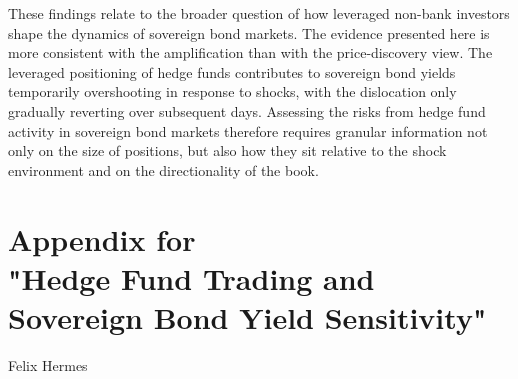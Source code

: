\documentclass[english, 11pt, oneside]{article}
\begin{document}
These findings relate to the broader question of how leveraged non-bank investors shape the dynamics of sovereign bond markets. The evidence presented here is more consistent with the amplification than with the price-discovery view. The leveraged positioning of hedge funds contributes to sovereign bond yields temporarily overshooting in response to shocks, with the dislocation only gradually reverting over subsequent days. Assessing the risks from hedge fund activity in sovereign bond markets therefore requires granular information not only on the size of positions, but also how they sit relative to the shock environment and on the directionality of the book.


\clearpage



\clearpage
\section*{Appendix for \\
"Hedge Fund Trading and Sovereign Bond Yield Sensitivity"}
\begin{center}
    
\large Felix Hermes
\end{center}

\vspace{2cm}
 \begin{abstract}
 \begin{hyphenrules}{nohyphenation} 

\noindent This paper presents evidence that the leveraged positioning of hedge funds amplifies the response of sovereign bond yields to shocks, leading to temporary overshooting. Combining granular regulatory data on repo positions with high-frequency monetary policy surprises, I find that hedge fund trading is associated with more than a quarter of the total yield movement these surprises generate, and that the effect scales with position intensity. A sequence of progressively tighter specifications shows that the amplification reflects leveraged positioning itself rather than the selection of inherently volatile bonds or the behavior of the dealers that intermediate the trades. The amplification operates symmetrically, with comparable strength whether a shock moves prices in favor of a position or against it, consistent with leveraged investors rebalancing toward their desired exposure. The strength of the amplification depends on the structure of the hedge fund book. It is concentrated among bonds held within directional books and is essentially absent when the book offsets its long and short positions, which places the binding constraint at the level of the fund's portfolio rather than the individual bond. The directionality of leveraged positions, and not only their size, therefore shapes how shocks propagate through sovereign bond markets.


 \end{hyphenrules}
 \end{abstract}
\end{document}
